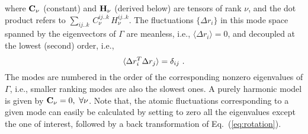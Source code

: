 \documentclass[12pt,article]{iopart}
\begin{document}
\noindent where ${\bf C}_\nu$ (constant) and ${\bf H}_\nu$ (derived
below) are tensors of rank $\nu$, and the dot product refers to
$\sum_{ij..k}\,C_\nu^{ij..k}\,H_\nu^{ij..k}$.  The fluctuations
$\{\Delta r_i\}$ in this mode space spanned by the eigenvectors of
$\Gamma$ are meanless, i.e., $\langle {\Delta r_i}\rangle = 0$, and
decoupled at the lowest (second) order, i.e.,
\begin{equation}
\langle {
\label{eqn:pair_corr}
  \Delta r_i^T \Delta r_j}\rangle = \delta_{ij}\ .
\end{equation}
The modes are numbered in the order of the corresponding nonzero
eigenvalues of $\Gamma$, i.e., smaller ranking modes are also the
slowest ones. A purely harmonic model is given by ${\bf C}_\nu =
0,\ \forall \nu$. Note that, the atomic fluctuations corresponding to
a given mode can easily be calculated by setting to zero all the
eigenvalues except the one of interest, followed by a back
transformation of Eq.~(\ref{eq:rotation}).
\end{document}
